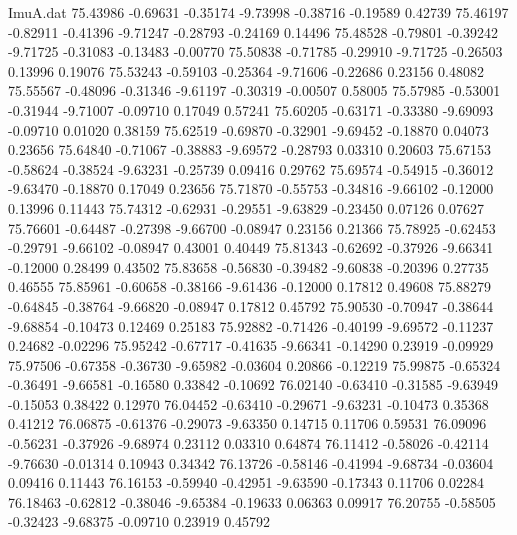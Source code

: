 \begin{filecontents}{ImuA.dat}
  75.43986   -0.69631   -0.35174   -9.73998   -0.38716   -0.19589    0.42739
  75.46197   -0.82911   -0.41396   -9.71247   -0.28793   -0.24169    0.14496
  75.48528   -0.79801   -0.39242   -9.71725   -0.31083   -0.13483   -0.00770
  75.50838   -0.71785   -0.29910   -9.71725   -0.26503    0.13996    0.19076
  75.53243   -0.59103   -0.25364   -9.71606   -0.22686    0.23156    0.48082
  75.55567   -0.48096   -0.31346   -9.61197   -0.30319   -0.00507    0.58005
  75.57985   -0.53001   -0.31944   -9.71007   -0.09710    0.17049    0.57241
  75.60205   -0.63171   -0.33380   -9.69093   -0.09710    0.01020    0.38159
  75.62519   -0.69870   -0.32901   -9.69452   -0.18870    0.04073    0.23656
  75.64840   -0.71067   -0.38883   -9.69572   -0.28793    0.03310    0.20603
  75.67153   -0.58624   -0.38524   -9.63231   -0.25739    0.09416    0.29762
  75.69574   -0.54915   -0.36012   -9.63470   -0.18870    0.17049    0.23656
  75.71870   -0.55753   -0.34816   -9.66102   -0.12000    0.13996    0.11443
  75.74312   -0.62931   -0.29551   -9.63829   -0.23450    0.07126    0.07627
  75.76601   -0.64487   -0.27398   -9.66700   -0.08947    0.23156    0.21366
  75.78925   -0.62453   -0.29791   -9.66102   -0.08947    0.43001    0.40449
  75.81343   -0.62692   -0.37926   -9.66341   -0.12000    0.28499    0.43502
  75.83658   -0.56830   -0.39482   -9.60838   -0.20396    0.27735    0.46555
  75.85961   -0.60658   -0.38166   -9.61436   -0.12000    0.17812    0.49608
  75.88279   -0.64845   -0.38764   -9.66820   -0.08947    0.17812    0.45792
  75.90530   -0.70947   -0.38644   -9.68854   -0.10473    0.12469    0.25183
  75.92882   -0.71426   -0.40199   -9.69572   -0.11237    0.24682   -0.02296
  75.95242   -0.67717   -0.41635   -9.66341   -0.14290    0.23919   -0.09929
  75.97506   -0.67358   -0.36730   -9.65982   -0.03604    0.20866   -0.12219
  75.99875   -0.65324   -0.36491   -9.66581   -0.16580    0.33842   -0.10692
  76.02140   -0.63410   -0.31585   -9.63949   -0.15053    0.38422    0.12970
  76.04452   -0.63410   -0.29671   -9.63231   -0.10473    0.35368    0.41212
  76.06875   -0.61376   -0.29073   -9.63350    0.14715    0.11706    0.59531
  76.09096   -0.56231   -0.37926   -9.68974    0.23112    0.03310    0.64874
  76.11412   -0.58026   -0.42114   -9.76630   -0.01314    0.10943    0.34342
  76.13726   -0.58146   -0.41994   -9.68734   -0.03604    0.09416    0.11443
  76.16153   -0.59940   -0.42951   -9.63590   -0.17343    0.11706    0.02284
  76.18463   -0.62812   -0.38046   -9.65384   -0.19633    0.06363    0.09917
  76.20755   -0.58505   -0.32423   -9.68375   -0.09710    0.23919    0.45792

\end{filecontents}
